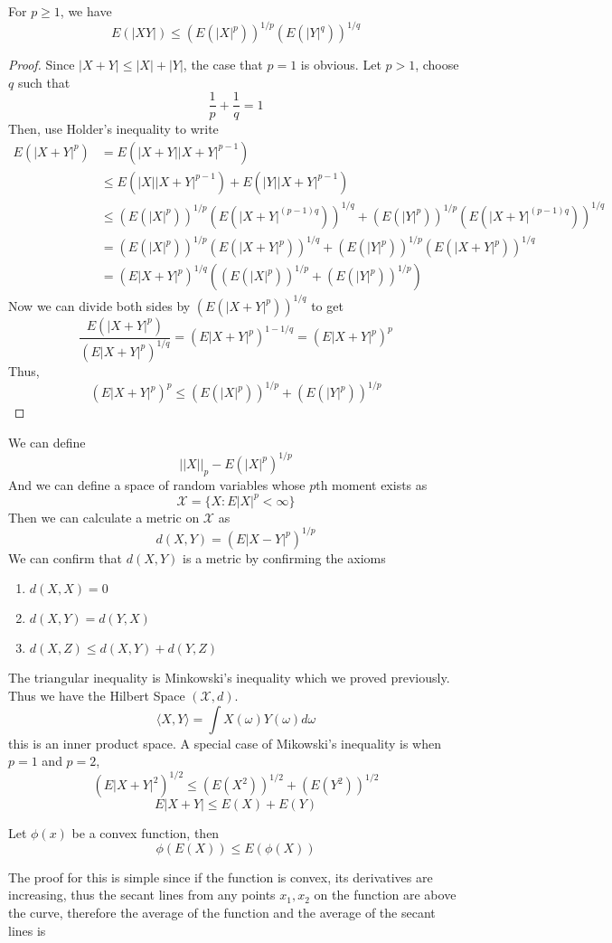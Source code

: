 \documentclass[openany]{report}
\begin{document}
\begin{theorem}
    For $p\geq 1$, we have 
    \[E(|XY|) \leq (E(|X|^p))^{1/p}(E(|Y|^q))^{1/q}\]
\end{theorem}
\begin{proof}
    Since $|X + Y| \leq |X| + |Y|$, the case that $p=1$ is obvious. Let $p > 1$, choose $q$ such that 
    \[\frac{1}{p} + \frac{1}{q} = 1\]
    Then, use Holder's inequality to write
    \begin{align*}
        E(|X + Y|^p) &= E(|X+Y||X+Y|^{p-1})\\
        &\leq E(|X||X+Y|^{p-1}) + E(|Y||X+Y|^{p-1})\\
        &\leq (E(|X|^p))^{1/p}(E(|X+Y|^{(p-1)q}))^{1/q} + (E(|Y|^p))^{1/p}(E(|X+Y|^{(p-1)q}))^{1/q}\\
        &= (E(|X|^p))^{1/p}(E(|X+Y|^{p}))^{1/q} + (E(|Y|^p))^{1/p}(E(|X+Y|^{p}))^{1/q}\\
        &= (E|X+Y|^p)^{1/q}((E(|X|^p))^{1/p} + (E(|Y|^p))^{1/p})
    \end{align*}
    Now we can divide both sides by $(E(|X+Y|^p))^{1/q}$ to get
    \[\frac{E(|X+Y|^p)}{(E|X+Y|^p)^{1/q}} = (E|X+Y|^p)^{1 - 1/q} = (E|X+Y|^p)^{p}\]
    Thus, 
    \[ (E|X+Y|^p)^{p} \leq (E(|X|^p))^{1/p} + (E(|Y|^p))^{1/p}\]
\end{proof}
We can define 
\[||X||_p - E(|X|^p)^{1/p}\]
And we can define a space of random variables whose $p$th moment exists as 
\[\mathcal{X} = \{X: E|X|^p < \infty\}\]
Then we can calculate a metric on $\mathcal{X}$ as 
\[d(X,Y) = (E|X-Y|^p)^{1/p}\]
We can confirm that $d(X,Y)$ is a metric by confirming the axioms 
\begin{enumerate}[label=(\roman*)]
    \item $d(X,X) = 0$
    \item $d(X,Y) = d(Y,X)$
    \item $d(X,Z) \leq d(X,Y) + d(Y,Z)$
\end{enumerate}
The triangular inequality is Minkowski's inequality which we proved previously. Thus we have the Hilbert Space $(\mathcal{X}, d)$. 
\[\langle X,Y\rangle = \int X(\omega)Y(\omega)d\omega\]
this is an inner product space. A special case of Mikowski's inequality is when $p=1$ and $p=2$, 
\[(E|X+Y|^2)^{1/2} \leq (E(X^2))^{1/2} + (E(Y^2))^{1/2}\]
\[E|X+Y| \leq E(X) + E(Y)\]
\begin{theorem}
    Let $\phi(x)$ be a convex function, then 
    \[\phi(E(X)) \leq E(\phi(X))\]
\end{theorem}
The proof for this is simple since if the function is convex, its derivatives are increasing, thus the secant lines from any points $x_1,x_2$ on the function are above the curve, therefore the average of the function and the average of the secant lines is 
\end{document}
